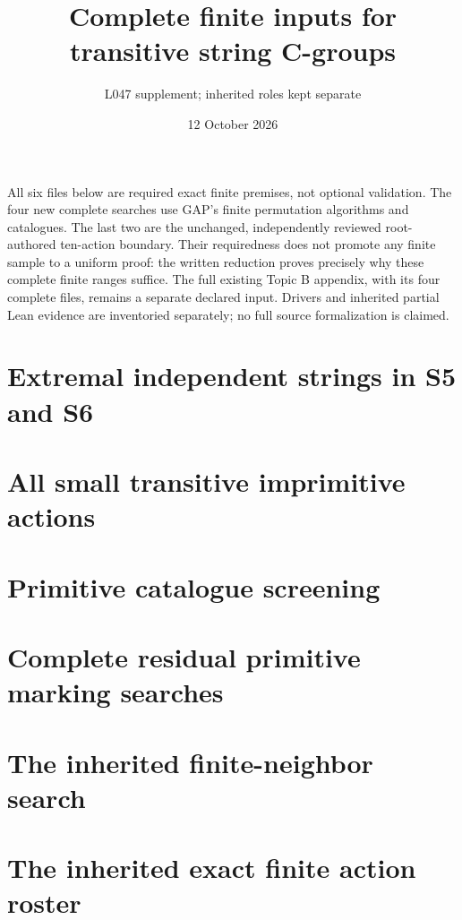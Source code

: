 \documentclass[10pt]{article}
\title{Complete finite inputs for transitive string C-groups}
\author{L047 supplement; inherited roles kept separate}
\date{12 October 2026}
\begin{document}
\maketitle
All six files below are required exact finite premises, not optional validation.
The four new complete searches use GAP's finite permutation algorithms and
catalogues. The last two are the unchanged, independently reviewed root-authored
ten-action boundary. Their requiredness does not promote any finite sample to a
uniform proof: the written reduction proves precisely why these complete finite
ranges suffice. The full existing Topic B appendix, with its four complete files,
remains a separate declared input. Drivers and inherited partial Lean evidence are
inventoried separately; no full source formalization is claimed.
\section*{Extremal independent strings in S5 and S6}
\section*{All small transitive imprimitive actions}
\section*{Primitive catalogue screening}
\section*{Complete residual primitive marking searches}
\section*{The inherited finite-neighbor search}
\section*{The inherited exact finite action roster}
\end{document}
